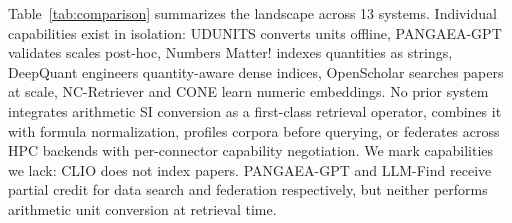 Table~\ref{tab:comparison} summarizes the landscape across 13 systems. Individual capabilities exist in isolation: UDUNITS converts units offline, PANGAEA-GPT validates scales post-hoc, Numbers Matter! indexes quantities as strings, DeepQuant engineers quantity-aware dense indices, OpenScholar searches papers at scale, NC-Retriever and CONE learn numeric embeddings. No prior system integrates arithmetic SI conversion as a first-class retrieval operator, combines it with formula normalization, profiles corpora before querying, or federates across HPC backends with per-connector capability negotiation. We mark capabilities we lack: CLIO does not index papers. PANGAEA-GPT and LLM-Find receive partial credit for data search and federation respectively, but neither performs arithmetic unit conversion at retrieval time.

